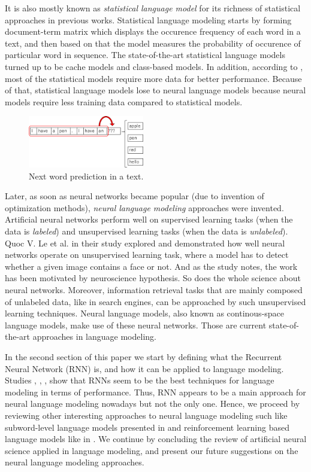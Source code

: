 \documentclass{IEEEtran}
\begin{document}
It is also mostly known as \textit{statistical language model} for its richness of statistical approaches in previous works. Statistical language modeling starts by forming document-term matrix which displays the occurence frequency of each word in a text, and then based on that the model measures the probability of occurence of particular word in sequence. The state-of-the-art statistical language models turned up to be cache models and class-based models. In addition, according to \cite{Mikolov2010NeuralLM}, most of the statistical models require more data for better performance. Because of that, statistical language models lose to neural language models because neural models require less training data compared to statistical models.

\begin{figure}[h]
	\centering
	\includegraphics[width=0.45\textwidth]{sequence}
	\caption{Next word prediction in a text.}
	\label{fig:sequence}
\end{figure}

Later, as soon as neural networks became popular (due to invention of optimization methods), \textit{neural language modeling} approaches were invented. Artificial neural networks perform well on supervised learning tasks (when the data is \textit{labeled}) and unsupervised learning tasks (when the data is \textit{unlabeled}). Quoc V. Le et al. in their study \cite{unsupervised} explored and demonstrated how well neural networks operate on unsupervised learning task, where a model has to detect whether a given image contains a face or not. And as the study \cite{unsupervised} notes, the work has been motivated by neuroscience hypothesis. So does the whole science about neural networks. Moreover, information retrieval tasks that are mainly composed of unlabeled data, like in search engines, can be approached by such unsupervised learning techniques. Neural language models, also known as continous-space language models, make use of these neural networks. Those are current state-of-the-art approaches in language modeling.

In the second section of this paper we start by defining what the Recurrent Neural Network (RNN) is, and how it can be applied to language modeling. Studies \cite{Mikolov2010NeuralLM}, \cite{Mikolov2011ExtensionsOR}, \cite{Zaremba2014LSTM}, \cite{Salakhutdinov2017Softmax} show that RNNs seem to be the best techniques for language modeling in terms of performance. Thus, RNN appears to be a main approach for neural language modeling nowadays but not the only one. Hence, we proceed by reviewing other interesting approaches to neural language modeling such like subword-level language models presented in \cite{Mikolov2011SubwordLM} and reinforcement learning based language models like in \cite{Quoc2017Reinforcement}. We continue by concluding the review of artificial neural science applied in language modeling, and present our future suggestions on the neural language modeling approaches. 
\end{document}

